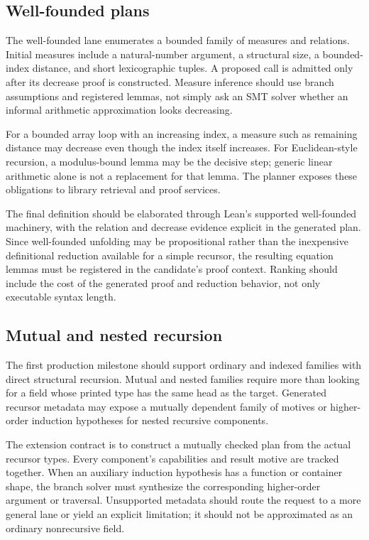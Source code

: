 \documentclass[11pt,letterpaper]{article}
\theoremstyle{definition}
\theoremstyle{remark}
\begin{document}
\subsection{Well-founded plans}

The well-founded lane enumerates a bounded family of measures and relations. Initial measures include a natural-number argument, a structural size, a bounded-index distance, and short lexicographic tuples. A proposed call is admitted only after its decrease proof is constructed. Measure inference should use branch assumptions and registered lemmas, not simply ask an SMT solver whether an informal arithmetic approximation looks decreasing.

For a bounded array loop with an increasing index, a measure such as remaining distance may decrease even though the index itself increases. For Euclidean-style recursion, a modulus-bound lemma may be the decisive step; generic linear arithmetic alone is not a replacement for that lemma. The planner exposes these obligations to library retrieval and proof services.

The final definition should be elaborated through Lean's supported well-founded machinery, with the relation and decrease evidence explicit in the generated plan. Since well-founded unfolding may be propositional rather than the inexpensive definitional reduction available for a simple recursor, the resulting equation lemmas must be registered in the candidate's proof context. Ranking should include the cost of the generated proof and reduction behavior, not only executable syntax length.

\subsection{Mutual and nested recursion}

The first production milestone should support ordinary and indexed families with direct structural recursion. Mutual and nested families require more than looking for a field whose printed type has the same head as the target. Generated recursor metadata may expose a mutually dependent family of motives or higher-order induction hypotheses for nested recursive components.

The extension contract is to construct a mutually checked plan from the actual recursor types. Every component's capabilities and result motive are tracked together. When an auxiliary induction hypothesis has a function or container shape, the branch solver must synthesize the corresponding higher-order argument or traversal. Unsupported metadata should route the request to a more general lane or yield an explicit limitation; it should not be approximated as an ordinary nonrecursive field.
\end{document}
